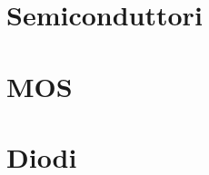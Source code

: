 \providecommand{\main}{.}


\usepackage{tikz}
\usepackage{relsize}
\usepackage{circuitikz}
\usepackage{graphicx}

\setlength\arraycolsep{2em}





{\hypersetup{hidelinks}
	\tableofcontents  %
}

%

\clearpage
\chapter{Semiconduttori}

\clearpage
\chapter{MOS}

\clearpage
\chapter{Diodi}

\clearpage

%

\appendix
%



